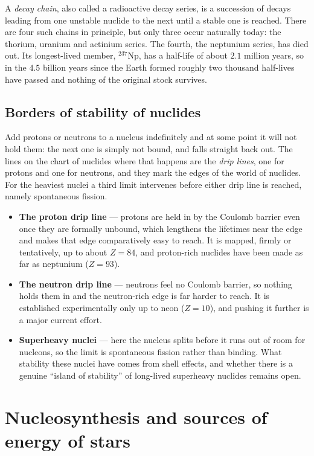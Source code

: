         A \emph{decay chain}, also called a radioactive decay series, is a succession of decays leading from one unstable nuclide to the next until a stable one is reached. There are four such chains in principle, but only three occur naturally today: the thorium, uranium and actinium series. The fourth, the neptunium series, has died out. Its longest-lived member, ${}^{237}$Np, has a half-life of about $2.1$ million years, so in the $4.5$ billion years since the Earth formed roughly two thousand half-lives have passed and nothing of the original stock survives.

    \subsection{Borders of stability of nuclides}

        Add protons or neutrons to a nucleus indefinitely and at some point it will not hold them: the next one is simply not bound, and falls straight back out. The lines on the chart of nuclides where that happens are the \emph{drip lines}, one for protons and one for neutrons, and they mark the edges of the world of nuclides. For the heaviest nuclei a third limit intervenes before either drip line is reached, namely spontaneous fission.

        \begin{itemize}
            \item \textbf{The proton drip line} --- protons are held in by the Coulomb barrier even once they are formally unbound, which lengthens the lifetimes near the edge and makes that edge comparatively easy to reach. It is mapped, firmly or tentatively, up to about $Z=84$, and proton-rich nuclides have been made as far as neptunium ($Z=93$).
            \item \textbf{The neutron drip line} --- neutrons feel no Coulomb barrier, so nothing holds them in and the neutron-rich edge is far harder to reach. It is established experimentally only up to neon ($Z=10$), and pushing it further is a major current effort.
            \item \textbf{Superheavy nuclei} --- here the nucleus splits before it runs out of room for nucleons, so the limit is spontaneous fission rather than binding. What stability these nuclei have comes from shell effects, and whether there is a genuine \enquote{island of stability} of long-lived superheavy nuclides remains open.
        \end{itemize}

\section{Nucleosynthesis and sources of energy of stars}
\label{sec:nucleosynthesis}

